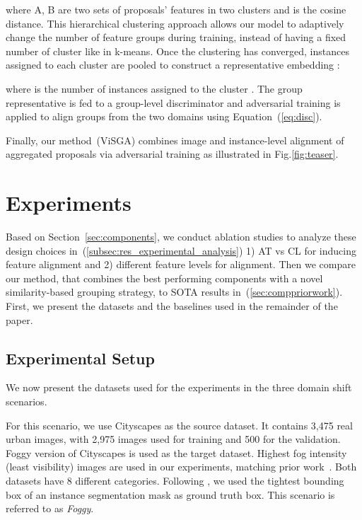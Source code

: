 \documentclass[10pt,twocolumn,letterpaper]{article}
\DeclareRobustCommand{\secref}[1]{Section~\ref{#1}}
\DeclareRobustCommand{\eqnref}[1]{Equation~(\ref{#1})}
\def\ourda{ViSGA\xspace}
\begin{document}
\noindent where A, B are two sets of proposals' features in two clusters and  is the cosine distance. 
This hierarchical clustering approach allows our model to adaptively change the number of feature groups during training, instead of having a fixed number of cluster like in k-means. 
Once the clustering has converged, instances assigned to each cluster are pooled to construct a representative embedding :

\noindent where  is the number of instances assigned to the cluster . 
The group representative  is fed to a group-level discriminator and adversarial training is applied to align groups from the two domains using \eqnref{eq:disc}.

Finally, our method~(\ourda) combines image and instance-level alignment of aggregated proposals via adversarial training as illustrated in Fig.\ref{fig:teaser}.
 


\section{Experiments}
\label{sec:analysis}
Based on \secref{sec:components}, 
we conduct ablation studies to analyze these design choices in~(\ref{subsec:res_experimental_analysis}) 1) AT vs CL for inducing feature alignment and 2) different feature levels for alignment. Then we compare our method, that combines the best performing components with a novel similarity-based grouping strategy, to SOTA results in~(\ref{sec:comppriorwork}). First, we present the datasets and the baselines used in the remainder of the paper.

\subsection{Experimental Setup}
\label{sec:expsetup}
We now present the datasets used for the experiments in the three domain shift scenarios. 


 For this scenario, we use Cityscapes \cite{city} as the source dataset. It contains 3,475 real urban images, with 2,975 images used for training and 500 for the validation. Foggy version of Cityscapes \cite{foggy} is used as the target dataset. 
Highest fog intensity (least visibility) images are used in our experiments, matching prior work~\cite{GPA}. 
Both datasets have 8 different categories. 
Following \cite{da_faster_rcnn}, we used the tightest bounding box of an instance segmentation mask as ground truth box. This scenario is referred to as \emph{Foggy}.
\end{document}
